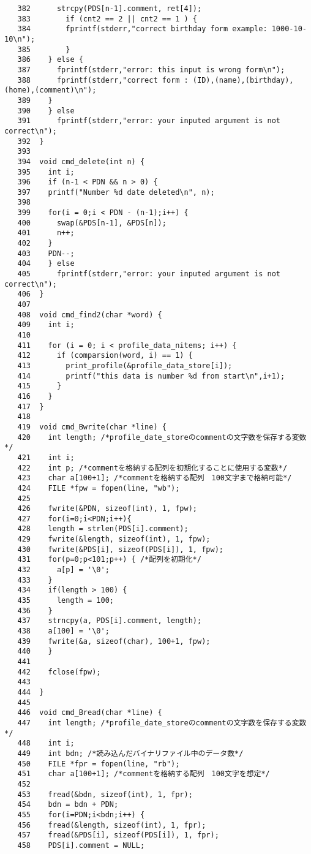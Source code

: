 \documentclass[a4paper,11pt]{jarticle}
\begin{document}
{\begin{verbatim}
   382      strcpy(PDS[n-1].comment, ret[4]);
   383        if (cnt2 == 2 || cnt2 == 1 ) { 
   384        fprintf(stderr,"correct birthday form example: 1000-10-10\n");
   385        }
   386    } else {
   387      fprintf(stderr,"error: this input is wrong form\n");
   388      fprintf(stderr,"correct form : (ID),(name),(birthday),(home),(comment)\n");
   389    }
   390    } else
   391      fprintf(stderr,"error: your inputed argument is not correct\n");
   392  }
   393  
   394  void cmd_delete(int n) {
   395    int i;
   396    if (n-1 < PDN && n > 0) {    
   397    printf("Number %d date deleted\n", n);
   398    
   399    for(i = 0;i < PDN - (n-1);i++) {
   400      swap(&PDS[n-1], &PDS[n]);
   401      n++;
   402    }
   403    PDN--;
   404    } else
   405      fprintf(stderr,"error: your inputed argument is not correct\n");
   406  }
   407  
   408  void cmd_find2(char *word) {
   409    int i;
   410  
   411    for (i = 0; i < profile_data_nitems; i++) {
   412      if (comparsion(word, i) == 1) {
   413        print_profile(&profile_data_store[i]);
   414        printf("this data is number %d from start\n",i+1);
   415      }
   416    }
   417  } 
   418  
   419  void cmd_Bwrite(char *line) {
   420    int length; /*profile_date_storeのcommentの文字数を保存する変数*/
   421    int i;
   422    int p; /*commentを格納する配列を初期化することに使用する変数*/
   423    char a[100+1]; /*commentを格納する配列　100文字まで格納可能*/
   424    FILE *fpw = fopen(line, "wb");
   425  
   426    fwrite(&PDN, sizeof(int), 1, fpw);
   427    for(i=0;i<PDN;i++){
   428    length = strlen(PDS[i].comment);
   429    fwrite(&length, sizeof(int), 1, fpw);
   430    fwrite(&PDS[i], sizeof(PDS[i]), 1, fpw);
   431    for(p=0;p<101;p++) { /*配列を初期化*/
   432      a[p] = '\0';
   433    }
   434    if(length > 100) {
   435      length = 100;
   436    }
   437    strncpy(a, PDS[i].comment, length);
   438    a[100] = '\0';
   439    fwrite(&a, sizeof(char), 100+1, fpw);
   440    }
   441    
   442    fclose(fpw);
   443   
   444  } 
   445  
   446  void cmd_Bread(char *line) {
   447    int length; /*profile_date_storeのcommentの文字数を保存する変数*/
   448    int i;
   449    int bdn; /*読み込んだバイナリファイル中のデータ数*/
   450    FILE *fpr = fopen(line, "rb");
   451    char a[100+1]; /*commentを格納する配列　100文字を想定*/
   452    
   453    fread(&bdn, sizeof(int), 1, fpr);
   454    bdn = bdn + PDN;
   455    for(i=PDN;i<bdn;i++) {
   456    fread(&length, sizeof(int), 1, fpr);
   457    fread(&PDS[i], sizeof(PDS[i]), 1, fpr);
   458    PDS[i].comment = NULL; 

\end{verbatim}}
\end{document}
